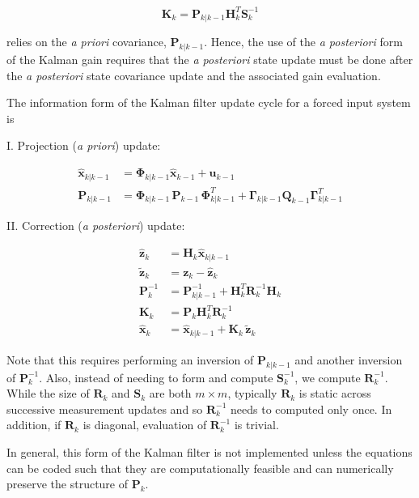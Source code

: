 \begin{equation*}
    \mathbf{K}_k = \mathbf{P}_{k|k-1} \mathbf{H}_k^T \mathbf{S}_k^{-1}
\end{equation*}

relies on the \textit{a priori} covariance, $\mathbf{P}_{k|k-1}$.
Hence, the use of the \textit{a posteriori} form of the Kalman gain requires that the
\textit{a posteriori} state update must be done after the \textit{a posteriori} state
covariance update and the associated gain evaluation.

The information form of the Kalman filter update cycle for a forced input system is

I. Projection (\textit{a priori}) update:

\begin{equation*}
    \begin{aligned}
        \hat{\mathbf{x}}_{k|k-1} &= \mathbf{\Phi}_{k|k-1} \hat{\mathbf{x}}_{k-1} + \mathbf{u}_{k-1} \\
        \mathbf{P}_{k|k-1} &= \mathbf{\Phi}_{k|k-1} \, \mathbf{P}_{k-1} \, \mathbf{\Phi}_{k|k-1}^T + \mathbf{\Gamma}_{k|k-1} \mathbf{Q}_{k-1} \mathbf{\Gamma}_{k|k-1}^T
    \end{aligned}
\end{equation*}

II. Correction (\textit{a posteriori}) update:

\begin{equation*}
    \begin{aligned}
        \hat{\mathbf{z}}_k &= \mathbf{H}_k \hat{\mathbf{x}}_{k|k-1} \\
        \tilde{\mathbf{z}}_k &= \mathbf{z}_k - \hat{\mathbf{z}}_k \\
        \mathbf{P}_k^{-1} &= \mathbf{P}_{k|k-1}^{-1} + \mathbf{H}_k^T \mathbf{R}_k^{-1} \mathbf{H}_k \\
        \mathbf{K}_{k} &= \mathbf{P}_k \mathbf{H}_k^T \mathbf{R}_k^{-1} \\
        \hat{\mathbf{x}}_k &= \hat{\mathbf{x}}_{k|k-1} +\mathbf{K}_k \, \tilde{\mathbf{z}}_k
    \end{aligned}
\end{equation*}

Note that this requires performing an inversion of $\mathbf{P}_{k|k-1}$ and another
inversion of $\mathbf{P}_k^{-1}$. Also, instead of needing to form and compute
$\mathbf{S}_k^{-1}$, we compute $\mathbf{R}_k^{-1}$. While the size of $\mathbf{R}_k$
and $\mathbf{S}_k$ are both $m \times m$, typically $\mathbf{R}_k$ is static across
successive measurement updates and so $\mathbf{R}_k^{-1}$ needs to computed only once.
In addition, if $\mathbf{R}_k$ is diagonal, evaluation of $\mathbf{R}_k^{-1}$ is trivial.

In general, this form of the Kalman filter is not implemented unless the equations can
be coded such that they are computationally feasible and can numerically preserve the
structure of $\mathbf{P}_k$.

